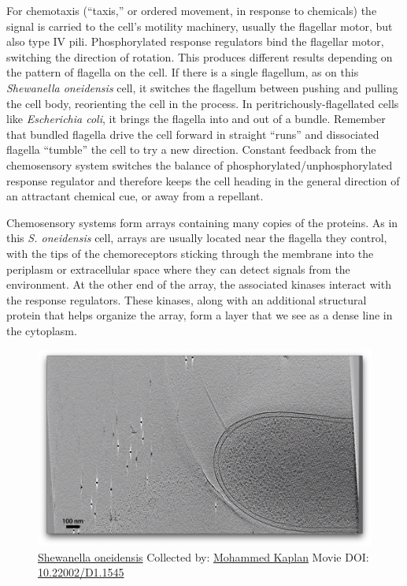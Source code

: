 \documentclass[]{tufte-book}
\begin{document}
For chemotaxis (``taxis,'' or ordered movement, in response to
chemicals) the signal is carried to the cell's motility machinery,
usually the flagellar motor, but also type IV pili. Phosphorylated
response regulators bind the flagellar motor, switching the direction of
rotation. This produces different results depending on the pattern of
flagella on the cell. If there is a single flagellum, as on this
\emph{Shewanella oneidensis} cell, it switches the flagellum between
pushing and pulling the cell body, reorienting the cell in the process.
In peritrichously-flagellated cells like \emph{Escherichia coli}, it
brings the flagella into and out of a bundle. Remember that bundled
flagella drive the cell forward in straight ``runs'' and dissociated
flagella ``tumble'' the cell to try a new direction. Constant feedback
from the chemosensory system switches the balance of
phosphorylated/unphosphorylated response regulator and therefore keeps
the cell heading in the general direction of an attractant chemical cue,
or away from a repellant.

Chemosensory systems form arrays containing many copies of the proteins.
As in this \emph{S. oneidensis} cell, arrays are usually located near
the flagella they control, with the tips of the chemoreceptors sticking
through the membrane into the periplasm or extracellular space where
they can detect signals from the environment. At the other end of the
array, the associated kinases interact with the response regulators.
These kinases, along with an additional structural protein that helps
organize the array, form a layer that we see as a dense line in the
cytoplasm.





\begin{figure}
\includegraphics{movie_stills/7_1} \caption[\protect\hyperlink{tree}{Shewanella oneidensis} Collected by:
\protect\hyperlink{mohammed_kaplan}{Mohammed Kaplan} Movie DOI:
\href{https://doi.org/10.22002/D1.1545}{10.22002/D1.1545}]{\protect\hyperlink{tree}{Shewanella oneidensis} Collected by:
\protect\hyperlink{mohammed_kaplan}{Mohammed Kaplan} Movie DOI:
\href{https://doi.org/10.22002/D1.1545}{10.22002/D1.1545}}\label{fig:7-1}
\end{figure}
\end{document}
